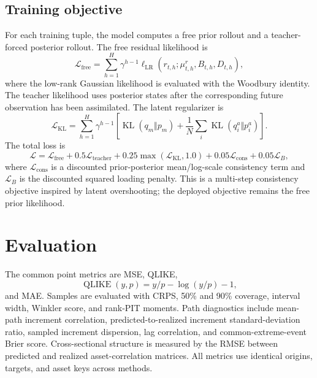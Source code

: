\documentclass[11pt]{article}
\begin{document}
\subsection{Training objective}
For each training tuple, the model computes a free prior rollout and a teacher-forced posterior rollout. The free residual likelihood is
\begin{equation}
 \mathcal L_{\mathrm{free}}=\sum_{h=1}^{H}\gamma^{h-1}\ell_{\mathrm{LR}}(r_{t,h};\mu^r_{t,h},B_{t,h},D_{t,h}),
\end{equation}
where the low-rank Gaussian likelihood is evaluated with the Woodbury identity. The teacher likelihood uses posterior states after the corresponding future observation has been assimilated. The latent regularizer is
\begin{equation}
 \mathcal L_{\mathrm{KL}}=\sum_{h=1}^{H}\gamma^{h-1}\left[\operatorname{KL}(q_m\Vert p_m)+\frac1N\sum_i\operatorname{KL}(q_i^a\Vert p_i^a)\right].
\end{equation}
The total loss is
\begin{equation}
 \mathcal L=\mathcal L_{\mathrm{free}}+0.5\mathcal L_{\mathrm{teacher}}+0.25\max(\mathcal L_{\mathrm{KL}},1.0)+0.05\mathcal L_{\mathrm{cons}}+0.05\mathcal L_B,
\end{equation}
where $\mathcal L_{\mathrm{cons}}$ is a discounted prior-posterior mean/log-scale consistency term and $\mathcal L_B$ is the discounted squared loading penalty. This is a multi-step consistency objective inspired by latent overshooting; the deployed objective remains the free prior likelihood.

\section{Evaluation}
The common point metrics are MSE, QLIKE,
\begin{equation}
 \operatorname{QLIKE}(y,p)=y/p-\log(y/p)-1,
\end{equation}
and MAE. Samples are evaluated with CRPS, 50\% and 90\% coverage, interval width, Winkler score, and rank-PIT moments. Path diagnostics include mean-path increment correlation, predicted-to-realized increment standard-deviation ratio, sampled increment dispersion, lag correlation, and common-extreme-event Brier score. Cross-sectional structure is measured by the RMSE between predicted and realized asset-correlation matrices. All metrics use identical origins, targets, and asset keys across methods.
\end{document}
